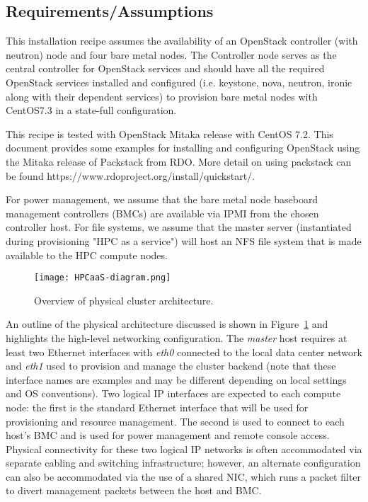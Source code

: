 \subsection{Requirements/Assumptions}

This installation recipe assumes the availability of an OpenStack controller (with neutron) node and four bare metal nodes. The Controller node serves as the central controller for OpenStack services and should have all the required OpenStack services installed and configured (i.e. keystone, nova, neutron, ironic along with their dependent services) to provision bare metal nodes with CentOS7.3 in a state-full 
configuration. 

This recipe is tested with OpenStack Mitaka release with CentOS 7.2. This 
document provides some examples for installing and configuring OpenStack using the Mitaka release of Packstack from RDO. More detail on using packstack can be found https://www.rdoproject.org/install/quickstart/. 

For power management, we assume that the bare metal node baseboard management controllers (BMCs) are available via IPMI from the chosen controller host. For file systems, we assume that the master server (instantiated during provisioning "HPC as a service") will host an NFS file system that is made available to the HPC compute nodes.



\begin{figure}[hbt]
\center
\texttt{[image: HPCaaS-diagram.png]}
\vspace*{-0.2cm}
\caption{Overview of physical cluster architecture.} \label{fig:physical_arch}
\end{figure}
\mbox{}

\vspace*{0.5cm}

An outline of the physical architecture discussed is shown in
Figure~\ref{fig:physical_arch} and highlights the high-level networking
configuration. The {\em master} host requires at least two Ethernet interfaces with {\em eth0} connected to the local data center network and {\em eth1} used to provision and manage the cluster backend (note that these interface names are examples and may be different depending on local settings and OS conventions). Two logical IP interfaces are expected to each compute node: the first is the standard Ethernet interface that will be used for provisioning and resource management. The second is used to connect to each host's BMC and is used for power management and remote console access. Physical connectivity for these two logical IP networks is often accommodated via separate cabling and switching infrastructure; however, an alternate configuration can also be accommodated via the use of a shared NIC, which runs a packet filter to divert management packets between the host and BMC.

